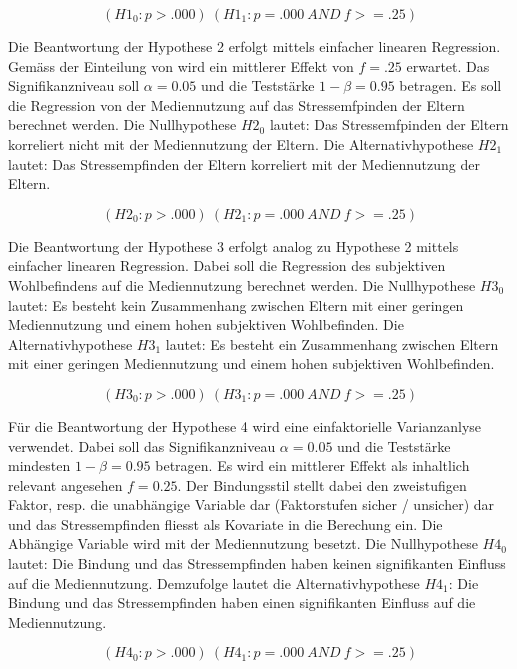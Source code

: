 \begin{equation}\label{eq:Hypothese_1}
    (H1_{0}:p>.000)~(H1_{1}:p=.000 ~ AND ~ f>=.25)
\end{equation}

Die Beantwortung der Hypothese 2 erfolgt mittels einfacher linearen Regression. Gemäss der Einteilung von  wird ein mittlerer Effekt von $f=.25$ erwartet. Das Signifikanzniveau soll $\alpha=0.05$ und die Teststärke $1-\beta=0.95$ betragen. Es soll die Regression von der Mediennutzung auf das Stressemfpinden der Eltern berechnet werden. Die Nullhypothese $H2_{0}$ lautet: Das Stressemfpinden der Eltern korreliert nicht  mit der Mediennutzung der Eltern. Die Alternativhypothese $H2_{1}$ lautet: Das Stressempfinden der Eltern korreliert mit der Mediennutzung der Eltern.

\begin{equation}\label{eq:Hypothese_2}
    (H2_{0}:p>.000)~(H2_{1}:p=.000 ~ AND ~ f>=.25)
\end{equation}

Die Beantwortung der Hypothese 3 erfolgt analog zu Hypothese 2 mittels einfacher linearen Regression. Dabei soll die Regression des subjektiven Wohlbefindens auf die Mediennutzung berechnet werden. Die Nullhypothese $H3_{0}$ lautet: Es besteht kein Zusammenhang zwischen Eltern mit einer geringen Mediennutzung und einem hohen subjektiven Wohlbefinden. Die Alternativhypothese $H3_{1}$ lautet: Es besteht ein Zusammenhang zwischen Eltern mit einer geringen Mediennutzung und einem hohen subjektiven Wohlbefinden.

\begin{equation}\label{eq:Hypothese_3}
    (H3_{0}:p>.000)~(H3_{1}:p=.000 ~ AND ~ f>=.25)
\end{equation}

Für die Beantwortung der Hypothese 4 wird eine einfaktorielle Varianzanlyse verwendet. Dabei soll das Signifikanzniveau $\alpha=0.05$ und die Teststärke mindesten $1-\beta=0.95$ betragen. Es wird ein mittlerer Effekt \cite{Cohen1988a} als inhaltlich relevant angesehen $f = 0.25$. Der Bindungsstil stellt dabei den zweistufigen Faktor, resp. die unabhängige Variable dar (Faktorstufen sicher / unsicher) dar und das Stressempfinden fliesst als Kovariate in die Berechung ein. Die Abhängige Variable wird mit der Mediennutzung besetzt. Die Nullhypothese $H4_{0}$ lautet: Die Bindung und das Stressempfinden haben keinen signifikanten Einfluss auf die Mediennutzung. Demzufolge lautet die Alternativhypothese $H4_{1}$: Die Bindung und das Stressempfinden haben einen signifikanten Einfluss auf die Mediennutzung.

\begin{equation}\label{eq:Hypothese_4}
    (H4_{0}:p>.000)~(H4_{1}:p=.000 ~ AND ~ f>=.25)
\end{equation}